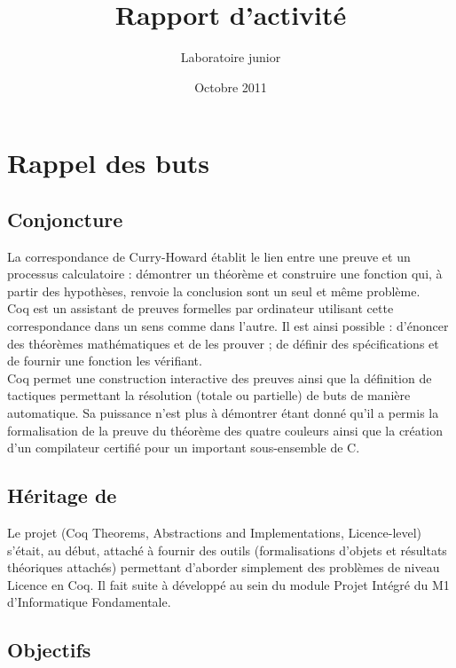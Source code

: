 \documentclass[11pt]{article}
\title{Rapport d'activité}
\author{Laboratoire junior \coqtail{}}
\date{Octobre 2011}
\begin{document}
\maketitle

\section{Rappel des buts}
\subsection{Conjoncture}
La correspondance de Curry-Howard établit le lien entre une preuve et un processus calculatoire : 
démontrer un théorème et construire une fonction qui, à partir des hypothèses, renvoie la conclusion 
sont un seul et même problème.\\

Coq est un assistant de preuves formelles par ordinateur utilisant cette correspondance dans un sens comme dans l'autre. Il est ainsi possible :
d'énoncer des théorèmes mathématiques et de les prouver ;
de définir des spécifications et de fournir une fonction les vérifiant.\\

Coq permet une construction interactive des preuves ainsi que la définition de tactiques permettant la résolution (totale ou partielle) de buts de manière automatique. Sa puissance n'est plus à démontrer étant donné qu'il a permis la formalisation de la preuve du théorème des quatre couleurs ainsi que la création d'un compilateur certifié pour un important sous-ensemble de C.

\subsection{Héritage de \coquille{}}

Le projet \coqtail{} (Coq Theorems, Abstractions and Implementations, Licence-level) s'était, au début, attaché à fournir des outils (formalisations d'objets et résultats théoriques attachés) permettant d'aborder simplement des problèmes de niveau Licence en Coq. Il fait suite à \coquille{} développé au sein du module Projet Intégré du M1 d'Informatique Fondamentale.

\subsection{Objectifs}
\end{document}
